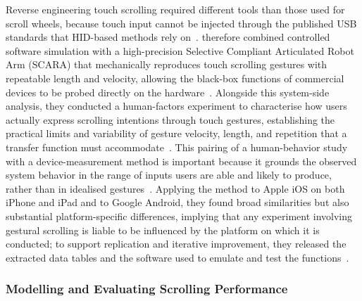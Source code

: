 Reverse engineering touch scrolling required different tools than those used for scroll wheels, because touch input cannot be injected through the published USB standards that HID-based methods rely on~\cite{quinn2013touch}. \citeauthor{quinn2013touch} therefore combined controlled software simulation with a high-precision Selective Compliant Articulated Robot Arm (SCARA) that mechanically reproduces touch scrolling gestures with repeatable length and velocity, allowing the black-box functions of commercial devices to be probed directly on the hardware~\cite{quinn2013touch}. Alongside this system-side analysis, they conducted a human-factors experiment to characterise how users actually express scrolling intentions through touch gestures, establishing the practical limits and variability of gesture velocity, length, and repetition that a transfer function must accommodate~\cite{quinn2013touch}. This pairing of a human-behavior study with a device-measurement method is important because it grounds the observed system behavior in the range of inputs users are able and likely to produce, rather than in idealised gestures~\cite{quinn2013touch}. Applying the method to Apple iOS on both iPhone and iPad and to Google Android, they found broad similarities but also substantial platform-specific differences, implying that any experiment involving gestural scrolling is liable to be influenced by the platform on which it is conducted; to support replication and iterative improvement, they released the extracted data tables and the software used to emulate and test the functions~\cite{quinn2013touch}.



\subsubsection{Modelling and Evaluating Scrolling Performance}

